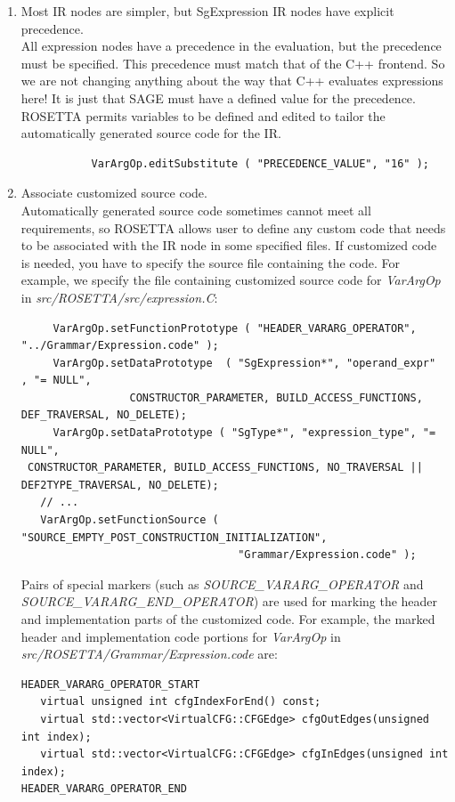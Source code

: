\begin{enumerate}
    \item Most IR nodes are simpler, but SgExpression IR nodes have explicit precedence. \\
           All expression nodes have a precedence in the evaluation, but the precedence must
           be specified.  This precedence must match that of the C++ frontend.  So we 
           are not changing anything about the way that C++ evaluates expressions here!
           It is just that SAGE must have a defined value for the precedence.
           ROSETTA permits variables to be defined and edited to tailor the automatically
           generated source code for the IR.
{\indent
{\mySmallFontSize
\begin{verbatim}
           VarArgOp.editSubstitute ( "PRECEDENCE_VALUE", "16" );
\end{verbatim} 
}}
     \item Associate customized source code. \\
           Automatically generated source code sometimes cannot meet all
           requirements, so ROSETTA allows user to define any custom 
           code that needs to be associated with the IR node in some
           specified files. If customized code is needed, you have to
           specify the source file containing the code. 
           For example, we specify the file containing customized source
           code for {\em VarArgOp} in \textit{src/ROSETTA/src/expression.C}:
{\indent
{\mySmallFontSize
\begin{verbatim}
     VarArgOp.setFunctionPrototype ( "HEADER_VARARG_OPERATOR", "../Grammar/Expression.code" );
     VarArgOp.setDataPrototype  ( "SgExpression*", "operand_expr"   , "= NULL",
				 CONSTRUCTOR_PARAMETER, BUILD_ACCESS_FUNCTIONS, DEF_TRAVERSAL, NO_DELETE);
     VarArgOp.setDataPrototype ( "SgType*", "expression_type", "= NULL",
 CONSTRUCTOR_PARAMETER, BUILD_ACCESS_FUNCTIONS, NO_TRAVERSAL || DEF2TYPE_TRAVERSAL, NO_DELETE);
   // ...
   VarArgOp.setFunctionSource ( "SOURCE_EMPTY_POST_CONSTRUCTION_INITIALIZATION", 
                                  "Grammar/Expression.code" );
\end{verbatim} 
}}
           Pairs of special markers (such as {\em SOURCE\_VARARG\_OPERATOR}
           and {\em SOURCE\_VARARG\_END\_OPERATOR}) are used for marking the header 
           and implementation parts of the customized code. 
           For example, the marked header and implementation code portions 
           for {\em VarArgOp} in
           \textit{src/ROSETTA/Grammar/Expression.code} are:
{\indent
  {\mySmallFontSize
\begin{verbatim}
HEADER_VARARG_OPERATOR_START
   virtual unsigned int cfgIndexForEnd() const;
   virtual std::vector<VirtualCFG::CFGEdge> cfgOutEdges(unsigned int index);
   virtual std::vector<VirtualCFG::CFGEdge> cfgInEdges(unsigned int index);
HEADER_VARARG_OPERATOR_END


\end{verbatim}}}
\end{enumerate}
